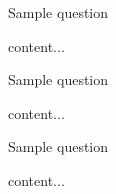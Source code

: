 \documentclass[11pt]{article} %
\begin{document}
	\begin{qstn}[8][][10]
		Sample question
	\begin{soln}
		content...
	\end{soln}
	\end{qstn}
	
	\begin{qstn}[9][][10]
		Sample question
	\begin{soln}
		content...
	\end{soln}
	\end{qstn}
	
	\begin{qstn}[10][][10]
		Sample question
	\begin{soln}
		content...
	\end{soln}
	\end{qstn}
\end{document}
